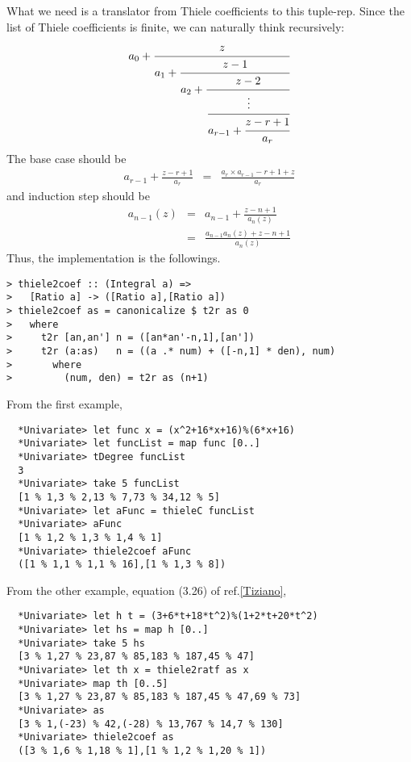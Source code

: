 \documentclass[11pt]{book}
\begin{document}
What we need is a translator from Thiele coefficients to this tuple-rep.
Since the list of Thiele coefficients is finite, we can naturally think recursively:
\begin{eqnarray}
a_0 + \cfrac{z}{a_1 + \cfrac{z-1}{a_2 + \cfrac{z- 2}{ \cfrac{\vdots}{a_{r-1} + \cfrac{z-r+1}{a_r}}}}}
\end{eqnarray}
The base case should be
\begin{eqnarray}
a_{r-1}+ \frac{z-r+1}{a_r} &=& \frac{a_r\times a_{r-1}-r+1 + z }{a_r} 
\end{eqnarray}
and induction step should be
\begin{eqnarray}
a_{n-1}(z)
&=&a_{n-1}+ \frac{z-n+1}{a_n(z)} \\
&=& \frac{a_{n-1}a_n(z)+ z -n+1}{a_n(z)} 
\end{eqnarray}
Thus, the implementation is the followings.
\begin{verbatim}
> thiele2coef :: (Integral a) => 
>   [Ratio a] -> ([Ratio a],[Ratio a])
> thiele2coef as = canonicalize $ t2r as 0
>   where
>     t2r [an,an'] n = ([an*an'-n,1],[an'])
>     t2r (a:as)   n = ((a .* num) + ([-n,1] * den), num)
>       where
>         (num, den) = t2r as (n+1)\end{verbatim}

From the first example,
\begin{verbatim}
  *Univariate> let func x = (x^2+16*x+16)%(6*x+16)
  *Univariate> let funcList = map func [0..]
  *Univariate> tDegree funcList 
  3
  *Univariate> take 5 funcList 
  [1 % 1,3 % 2,13 % 7,73 % 34,12 % 5]
  *Univariate> let aFunc = thieleC funcList 
  *Univariate> aFunc
  [1 % 1,2 % 1,3 % 1,4 % 1]
  *Univariate> thiele2coef aFunc
  ([1 % 1,1 % 1,1 % 16],[1 % 1,3 % 8])
\end{verbatim}

From the other example, equation (3.26) of ref.\ref{Tiziano},
\begin{verbatim}
  *Univariate> let h t = (3+6*t+18*t^2)%(1+2*t+20*t^2)
  *Univariate> let hs = map h [0..]
  *Univariate> take 5 hs
  [3 % 1,27 % 23,87 % 85,183 % 187,45 % 47]
  *Univariate> let th x = thiele2ratf as x
  *Univariate> map th [0..5]
  [3 % 1,27 % 23,87 % 85,183 % 187,45 % 47,69 % 73]
  *Univariate> as
  [3 % 1,(-23) % 42,(-28) % 13,767 % 14,7 % 130]
  *Univariate> thiele2coef as
  ([3 % 1,6 % 1,18 % 1],[1 % 1,2 % 1,20 % 1])
\end{verbatim}
\end{document}
